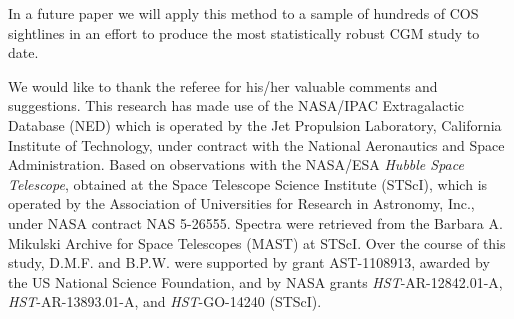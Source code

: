 \documentclass[twocolumn,tighten]{aastex6}
\begin{document}
\vspace{10pt}

In a future paper we will apply this method to a sample of hundreds of COS sightlines in an effort to produce the most statistically robust CGM study to date.


\acknowledgements

We would like to thank the referee for his/her valuable comments and suggestions. This research has made use of the NASA/IPAC Extragalactic Database (NED) which is operated by the Jet Propulsion Laboratory, California Institute of Technology, under contract with the National Aeronautics and Space Administration. Based on observations with the NASA/ESA \textit{Hubble Space Telescope}, obtained at the Space Telescope Science Institute (STScI), which is operated by the Association of Universities for Research in Astronomy, Inc., under NASA contract NAS 5-26555. Spectra were retrieved from the Barbara A. Mikulski Archive for Space Telescopes (MAST) at STScI. Over the course of this study, D.M.F. and B.P.W. were supported by grant AST-1108913, awarded by the US National Science Foundation, and by NASA grants \textit{HST}-AR-12842.01-A, \textit{HST}-AR-13893.01-A, and \textit{HST}-GO-14240 (STScI).



\nocite{*}


\end{document}
